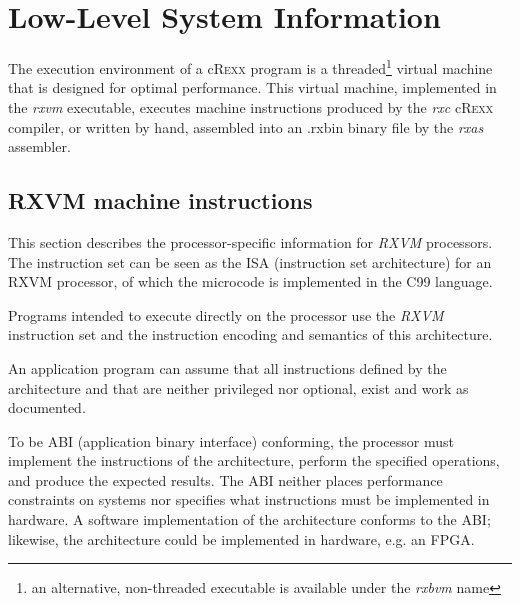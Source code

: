 \documentclass[english,11pt,twoside,toc=bib,toc=idx]{scrreprt}
\newcommand{\crexx}{c\textsc{Rexx}}
\begin{document}
\chapter{Low-Level System Information}
The execution environment of a \crexx{} program is a
threaded\footnote{an alternative, non-threaded executable is available
  under the \emph{rxbvm} name} virtual
machine that is designed for optimal performance. This virtual
machine, implemented in the \emph{rxvm} executable, executes
machine instructions produced by the \emph{rxc} \crexx{}
compiler, or written by hand, assembled into an .rxbin binary file by
the \emph{rxas} assembler.



\section{RXVM machine instructions}

This section describes the processor-specific information for
\emph{RXVM} processors. The instruction set can be seen as the ISA
(instruction set architecture) for
an RXVM processor, of which the microcode is implemented in the C99 language.

Programs intended to execute directly on the processor use the
\emph{RXVM} instruction set and the
instruction encoding and semantics of this architecture.

An application program can assume that all instructions defined by the
architecture and that are neither privileged nor optional, exist and work
as documented.

To be ABI (application binary interface) conforming, the processor must implement the instructions of
the architecture, perform the specified operations, and produce the
expected results.  The ABI neither places performance constraints on
systems nor specifies what instructions must be implemented in
hardware.  A software implementation of the architecture conforms to
the ABI; likewise, the architecture could be implemented in hardware,
e.g. an FPGA.
\end{document}
